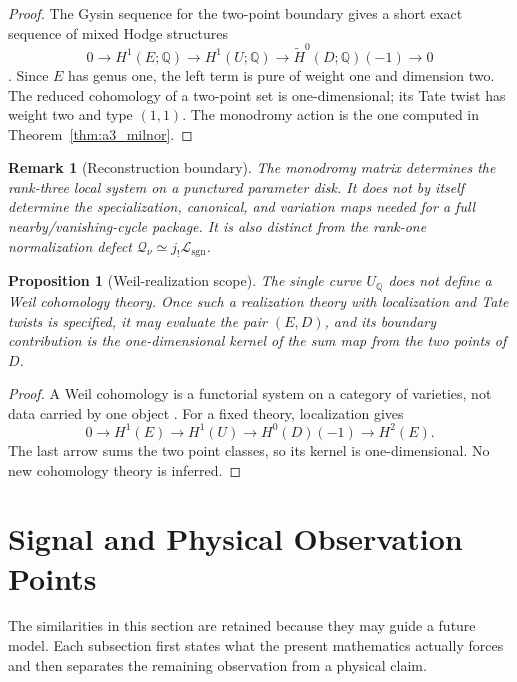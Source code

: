 \documentclass[11pt]{article}
\newtheorem{proposition}[theorem]{Proposition}
\newtheorem{remark}[theorem]{Remark}
\begin{document}
\begin{proof}
The Gysin sequence for the two-point boundary gives a short exact sequence of
mixed Hodge structures
\[
 0\longrightarrow H^1(E;\mathbb Q)\longrightarrow H^1(U;\mathbb Q)
 \longrightarrow \widetilde H^0(D;\mathbb Q)(-1)\longrightarrow0
\]
\cite{PetersSteenbrink2008}.  Since $E$ has genus one, the left term is pure
of weight one and dimension two.  The reduced cohomology of a two-point set is
one-dimensional; its Tate twist has weight two and type $(1,1)$.  The
monodromy action is the one computed in Theorem~\ref{thm:a3_milnor}.
\end{proof}

\begin{remark}[Reconstruction boundary]
The monodromy matrix determines the rank-three local system on a punctured
parameter disk.  It does not by itself determine the specialization,
canonical, and variation maps needed for a full nearby/vanishing-cycle
package.  It is also distinct from the rank-one normalization defect
$\mathcal Q_\nu\simeq j_!\mathcal L_{\mathrm{sgn}}$.
\end{remark}

\begin{proposition}[Weil-realization scope]
\label{prop:weil_scope}
The single curve $U_{\mathbb Q}$ does not define a Weil cohomology theory.
Once such a realization theory with localization and Tate twists is specified,
it may evaluate the pair $(E,D)$, and its boundary contribution is the
one-dimensional kernel of the sum map from the two points of $D$.
\end{proposition}

\begin{proof}
A Weil cohomology is a functorial system on a category of varieties, not data
carried by one object \cite{Ayoub2026}.  For a fixed theory, localization gives
\[
 0\longrightarrow H^1(E)\longrightarrow H^1(U)
 \longrightarrow H^0(D)(-1)\longrightarrow H^2(E).
\]
The last arrow sums the two point classes, so its kernel is one-dimensional.
No new cohomology theory is inferred.
\end{proof}

\section{Signal and Physical Observation Points}
\label{sec:emergent}
The similarities in this section are retained because they may guide a future
model.  Each subsection first states what the present mathematics actually
forces and then separates the remaining observation from a physical claim.
\end{document}
